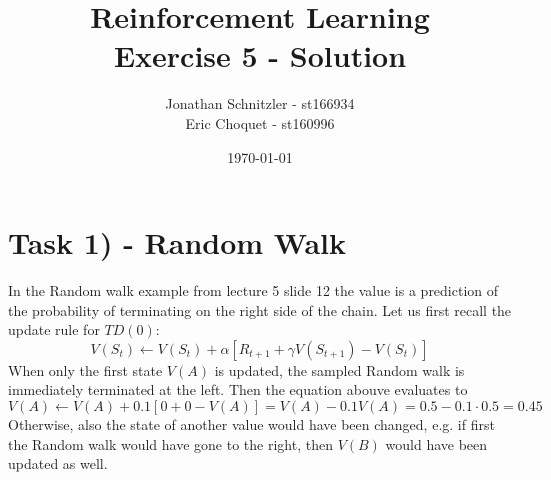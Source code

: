 \documentclass{article}
\title{Reinforcement Learning \\ Exercise 5 - Solution}
\author{Jonathan Schnitzler - st166934 \\
Eric Choquet - st160996}
\date{\today}
\begin{document}
\maketitle
\section*{Task 1) - Random Walk}
In the Random walk example from lecture 5 slide 12 the value is a prediction of the probability of terminating on the right side of the chain. Let us first recall the update rule for $TD(0)$:
\begin{equation}
    V(S_t) \leftarrow V(S_t) + \alpha \left[ R_{t+1} + \gamma V(S_{t+1}) - V(S_t) \right]
\end{equation}
When only the first state $V(A)$ is updated, the sampled Random walk is immediately terminated at the left. Then the equation abouve evaluates to
\begin{equation}
    V(A) \leftarrow V(A) + 0.1 \left[ 0 + 0 - V(A) \right] = V(A) - 0.1 V(A) = 0.5 - 0.1 \cdot 0.5 = 0.45
\end{equation}
Otherwise, also the state of another value would have been changed, e.g. if first the Random walk would have gone to the right, then $V(B)$ would have been updated as well.
\end{document}
